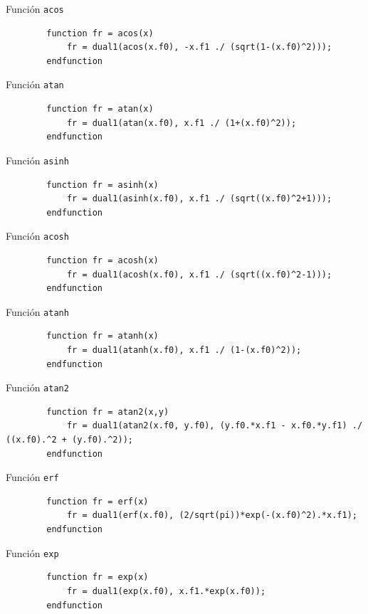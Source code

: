 \documentclass[a4paper, 12pt]{article}
\begin{document}
    Función \verb|acos|

    \begin{verbatim}
        function fr = acos(x)
            fr = dual1(acos(x.f0), -x.f1 ./ (sqrt(1-(x.f0)^2)));
        endfunction
    \end{verbatim}

    Función \verb|atan|

    \begin{verbatim}
        function fr = atan(x)
            fr = dual1(atan(x.f0), x.f1 ./ (1+(x.f0)^2));
        endfunction
    \end{verbatim}

    Función \verb|asinh|

    \begin{verbatim}
        function fr = asinh(x)
            fr = dual1(asinh(x.f0), x.f1 ./ (sqrt((x.f0)^2+1)));
        endfunction
    \end{verbatim}

    Función \verb|acosh|

    \begin{verbatim}
        function fr = acosh(x)
            fr = dual1(acosh(x.f0), x.f1 ./ (sqrt((x.f0)^2-1)));
        endfunction
    \end{verbatim}

    Función \verb|atanh|

    \begin{verbatim}
        function fr = atanh(x)
            fr = dual1(atanh(x.f0), x.f1 ./ (1-(x.f0)^2));
        endfunction
    \end{verbatim}

    Función \verb|atan2|

    \begin{verbatim}
        function fr = atan2(x,y)
            fr = dual1(atan2(x.f0, y.f0), (y.f0.*x.f1 - x.f0.*y.f1) ./ ((x.f0).^2 + (y.f0).^2));
        endfunction
    \end{verbatim}

    Función \verb|erf|

    \begin{verbatim}
        function fr = erf(x)
            fr = dual1(erf(x.f0), (2/sqrt(pi))*exp(-(x.f0)^2).*x.f1);
        endfunction
    \end{verbatim}

    Función \verb|exp|

    \begin{verbatim}
        function fr = exp(x)
            fr = dual1(exp(x.f0), x.f1.*exp(x.f0));
        endfunction
    \end{verbatim}
\end{document}
